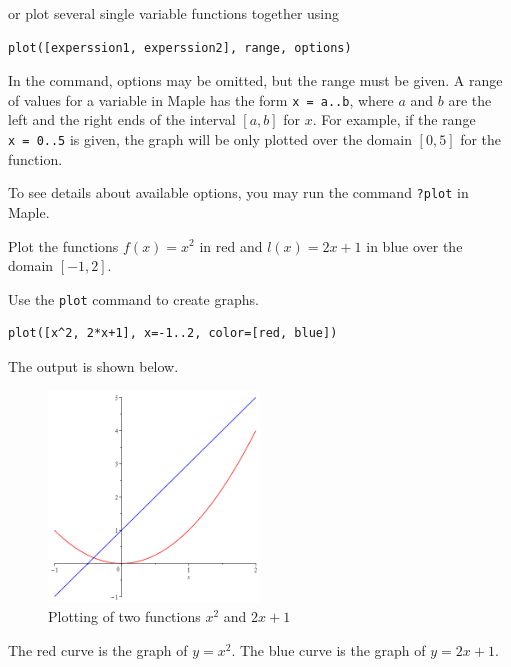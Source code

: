 \documentclass[
  12pt]{elegantbook}
\begin{document}
or plot several single variable functions together using

\begin{verbatim}
plot([experssion1, experssion2], range, options)
\end{verbatim}

In the command, options may be omitted, but the range must be given. A range of values for a variable in Maple has the form \texttt{x\ =\ a..b}, where \(a\) and \(b\) are the left and the right ends of the interval \([a, b]\) for \(x\). For example, if the range \texttt{x\ =\ 0..5} is given, the graph will be only plotted over the domain \([0, 5]\) for the function.

To see details about available options, you may run the command \texttt{?plot} in Maple.

\begin{example}
Plot the functions \(f(x)=x^2\) in red and \(l(x)=2x+1\) in blue over the domain \([-1, 2]\).
\end{example}

\begin{solution}
Use the \texttt{plot} command to create graphs.

\begin{verbatim}
plot([x^2, 2*x+1], x=-1..2, color=[red, blue])
\end{verbatim}

The output is shown below.

\begin{figure}
\centering
\includegraphics[width=0.5\textwidth,height=\textheight]{figs/First-Plot-Example.png}
\caption{Plotting of two functions \(x^2\) and \(2x+1\)}
\end{figure}

The red curve is the graph of \(y=x^2\). The blue curve is the graph of \(y=2x+1\).
\end{solution}
\end{document}
